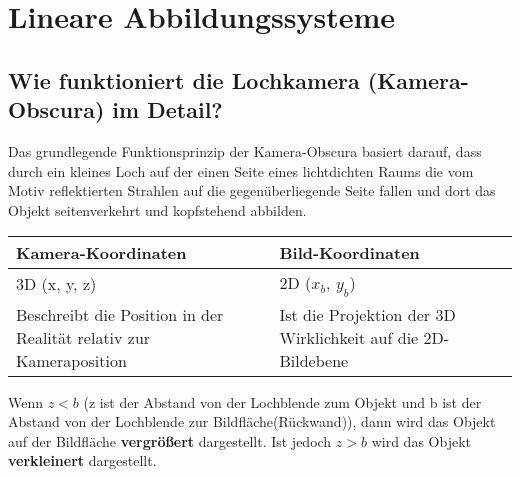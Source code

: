 \section{Lineare Abbildungssysteme}

\subsection{Wie funktioniert die Lochkamera (Kamera-Obscura) im Detail?}
Das grundlegende Funktionsprinzip der Kamera-Obscura basiert darauf, dass durch ein kleines Loch auf der einen Seite eines 
lichtdichten Raums die vom Motiv reflektierten Strahlen auf die gegenüberliegende Seite fallen und dort das Objekt seitenverkehrt 
und kopfstehend abbilden.



\noindent


\begin{table}[H]
  \begin{tabularx}{\linewidth}{| X | X |}
    \hline
    \rowcolor{Gray} \textbf{Kamera-Koordinaten} & \textbf{Bild-Koordinaten} \\\hline

    3D (x, y, z) & 2D ($x_b$, $y_b$)\\\hline
    Beschreibt die Position in der Realität relativ zur Kameraposition & Ist die Projektion der 3D Wirklichkeit auf die 2D-Bildebene\\\hline
  \end{tabularx}
\end{table}


\noindent
Wenn $z < b$ (z ist der Abstand von der Lochblende zum Objekt und b ist der Abstand von der Lochblende zur Bildfläche(Rückwand)), dann
wird das Objekt auf der Bildfläche \textbf{vergrößert} dargestellt. Ist jedoch $z > b$ wird das Objekt \textbf{verkleinert} dargestellt.

